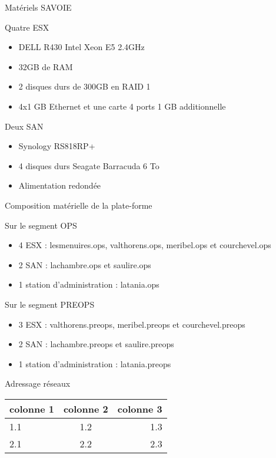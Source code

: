 \documentclass[10pt]{beamer}
\begin{document}
\begin{frame}{Matériels SAVOIE}
\begin{block}{Quatre ESX}
\begin{itemize}
\item DELL R430 Intel Xeon E5 2.4GHz
\item 32GB de RAM 
\item 2 disques durs de 300GB en RAID 1
\item 4x1 GB Ethernet et une carte 4 ports 1 GB additionnelle
\end{itemize}
\end{block}
\begin{block}{Deux SAN}
\begin{itemize}
\item Synology RS818RP+
\item 4 disques durs Seagate Barracuda 6 To
\item Alimentation redondée
\end{itemize}
\end{block}
\end{frame}

\begin{frame}{Composition matérielle de la plate-forme}
\begin{block}{Sur le segment OPS}
\begin{itemize}
\item 4 ESX : lesmenuires.ops, valthorens.ops, meribel.ops et courchevel.ops
\item 2 SAN : lachambre.ops et saulire.ops
\item 1 station d'administration : latania.ops
\end{itemize}
\end{block}
\begin{block}{Sur le segment PREOPS}
\begin{itemize}
\item 3 ESX : valthorens.preops, meribel.preops et courchevel.preops
\item 2 SAN : lachambre.preops et saulire.preops
\item 1 station d'administration : latania.preops
\end{itemize}
\end{block}
\end{frame}

\begin{frame}{Adressage réseaux}
\begin{center}
\begin{tabular}{|l|c|r|}
  \hline
  colonne 1 & colonne 2 & colonne 3 \\
  \hline
  1.1 & 1.2 & 1.3 \\
  2.1 & 2.2 & 2.3 \\
  \hline
\end{tabular}
\end{center}
\end{frame}
\end{document}
